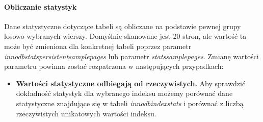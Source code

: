 \paragraph{Obliczanie statystyk}
Dane statystyczne dotyczące tabeli są obliczane na podstawie pewnej grupy losowo wybranych wierszy. Domyślnie skanowane jest 20 stron, ale wartość ta może być zmieniona dla konkretnej tabeli poprzez parametr \textit{innodb\textunderscore stats\textunderscore persistent\textunderscore sample\textunderscore pages} lub parametr \textit{stats\textunderscore sample\textunderscore pages}. Zmianę wartości parametru powinna zostać rozpatrzona w następujących przypadkach:
\begin{itemize}
	\item \textbf{Wartości statystyczne odbiegają od rzeczywistych.} \linebreak
	Aby sprawdzić dokładność statystyk dla wybranego indeksu możemy porównać dane statystyczne znajdujące się w tabeli \textit{innodb\textunderscore index\textunderscore stats} i porównać z liczbą rzeczywistych unikatowych wartości indeksu.
	

\end{itemize}
